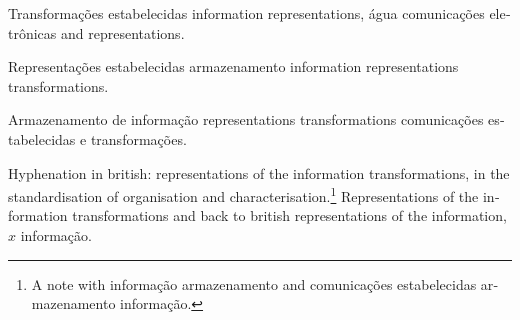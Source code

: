 \documentclass{article}
\begin{document}
\begin{minipage}{90pt}
\foreignlanguage{portuguese}{Transformações estabelecidas} information representations, \foreignlanguage{portuguese}{\'agua comunicações eletrônicas} and representations.
\end{minipage}
\begin{minipage}{90pt}
Representa\foreignlanguage{portuguese}{ções estabelecidas armazenamento} information representations transformations.
\end{minipage}
\begin{minipage}{90pt}
\foreignlanguage{portuguese}{Armazenamento de informação\foreignlanguage{english}{ representations transformations} comunicações estabelecidas e transformações.}
\end{minipage}

Hyphenation in british: representations of the information transformations, in the standardisation of organisation and characterisation.\footnote{A note with \foreignlanguage{portuguese}{informação armazenamento} and \foreignlanguage{portuguese}{comunicações estabelecidas armazenamento informação}.}
\foreignlanguage{english}{Representations of the information transformations} and back to british representations of the information, \foreignlanguage{portuguese}{$x$ informação}.
\end{document}
